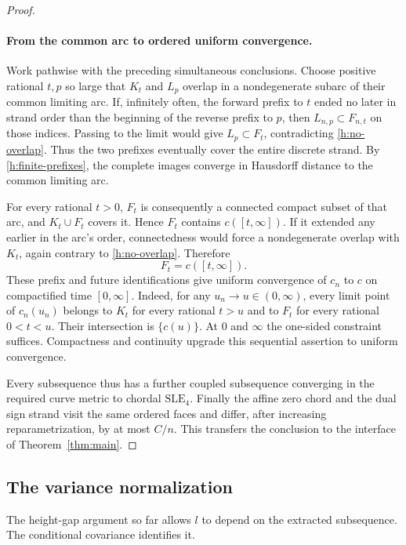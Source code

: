 \begin{proof}
\paragraph{From the common arc to ordered uniform convergence.}
Work pathwise with the preceding simultaneous conclusions. Choose
positive rational $t,p$ so large that $K_t$ and $L_p$ overlap in a
nondegenerate subarc of their common limiting arc. If, infinitely
often, the forward prefix to $t$ ended no later in strand order than
the beginning of the reverse prefix to $p$, then
$L_{n,p}\subset F_{n,t}$ on those indices. Passing to the limit would
give $L_p\subset F_t$, contradicting \eqref{h:no-overlap}. Thus the
two prefixes eventually cover the entire discrete strand. By
\eqref{h:finite-prefixes}, the complete images converge in Hausdorff
distance to the common limiting arc.

For every rational $t>0$, $F_t$ is consequently a connected compact
subset of that arc, and $K_t\cup F_t$ covers it. Hence $F_t$ contains
$c([t,\infty])$. If it extended any earlier in the arc's order,
connectedness would force a nondegenerate overlap with $K_t$, again
contrary to \eqref{h:no-overlap}. Therefore
\begin{equation}\label{h:limiting-futures}
 F_t=c([t,\infty]).
\end{equation}
These prefix and future identifications give uniform convergence of
$c_n$ to $c$ on compactified time $[0,\infty]$. Indeed, for any
$u_n\to u\in(0,\infty)$, every limit point of $c_n(u_n)$ belongs to
$K_t$ for every rational $t>u$ and to $F_t$ for every rational
$0<t<u$. Their intersection is $\{c(u)\}$. At $0$ and $\infty$ the
one-sided constraint suffices. Compactness and continuity upgrade
this sequential assertion to uniform convergence.

Every subsequence thus has a further coupled subsequence converging
in the required curve metric to chordal $\mathrm{SLE}_4$. Finally the
affine zero chord and the dual sign strand visit the same ordered
faces and differ, after increasing reparametrization, by at most
$C/n$. This transfers the conclusion to the interface of
Theorem~\ref{thm:main}.
\end{proof}

\subsection{The variance normalization}

The height-gap argument so far allows $l$ to depend on the extracted
subsequence. The conditional covariance identifies it.


